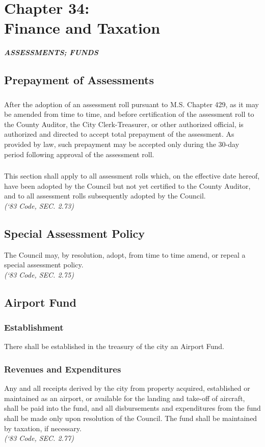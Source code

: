 \chapter*{Chapter 34: \\
	Finance and Taxation}
    \minitoc
    \pagebreak
    
\centerline{\textbf{\emph{\LARGE{ASSESSMENTS; FUNDS}}}}
\section{Prepayment of Assessments}
\subsection{}
After the adoption of an assessment roll pursuant to M.S. Chapter 429, as it may be amended from time to time, and before certification of the assessment roll to the County Auditor, the City Clerk-Treasurer, or other authorized official, is authorized and directed to accept total prepayment of the assessment.  As provided by law, such prepayment may be accepted only during the 30-day period following approval of the assessment roll.
\subsection{}
This section shall apply to all assessment rolls which, on the effective date hereof, have been adopted by the Council but not yet certified to the County Auditor, and to all assessment rolls subsequently adopted by the Council.\\
\emph{(‘83 Code, SEC. 2.73)}
\section{Special Assessment Policy}
The Council may, by resolution, adopt, from time to time amend, or repeal a special assessment policy.\\
\emph{(‘83 Code, SEC. 2.75)}
\section{Airport Fund}
\subsection{Establishment}
There shall be established in the treasury of the city an Airport Fund.
\subsection{Revenues and Expenditures}
Any and all receipts derived by the city from property acquired, established or maintained as an airport, or available for the landing and take-off of aircraft, shall be paid into the fund, and all disbursements and expenditures from the fund shall be made only upon resolution of the Council.  The fund shall be maintained by taxation, if necessary.\\
\emph{(‘83 Code, SEC. 2.77)}
